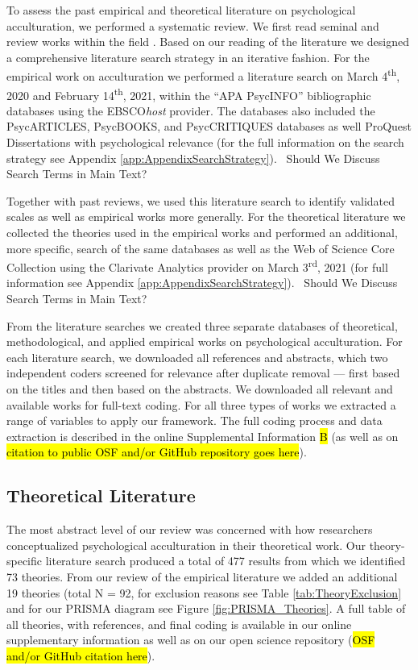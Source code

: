 To assess the past empirical and theoretical literature on psychological
acculturation, we performed a systematic review. We first read seminal
and review works within the field
\citep[including,][]{Ward2019, Berry1997b, Berry2003, Szapocznik1978, Sam2006a, Rudmin2003a}.
Based on our reading of the literature we designed a comprehensive
literature search strategy in an iterative fashion. For the empirical
work on acculturation we performed a literature search on March
4\textsuperscript{th}, 2020 and February 14\textsuperscript{th}, 2021,
within the ``APA PsycINFO'' bibliographic databases using the
EBSCO\textit{host} provider. The databases also included the
PsycARTICLES, PsycBOOKS, and PsycCRITIQUES databases as well ProQuest
Dissertations with psychological relevance (for the full information on
the search strategy see Appendix \ref{app:AppendixSearchStrategy}).
\Warning~Should We Discuss Search Terms in Main Text? \Warning

Together with past reviews, we used this literature search to identify
validated scales as well as empirical works more generally. For the
theoretical literature we collected the theories used in the empirical
works and performed an additional, more specific, search of the same
databases as well as the Web of Science Core Collection using the
Clarivate Analytics provider on March 3\textsuperscript{rd}, 2021 (for
full information see Appendix \ref{app:AppendixSearchStrategy}).
\Warning~Should We Discuss Search Terms in Main Text? \Warning~

From the literature searches we created three separate databases of
theoretical, methodological, and applied empirical works on
psychological acculturation. For each literature search, we downloaded
all references and abstracts, which two independent coders screened for
relevance after duplicate removal --- first based on the titles and then
based on the abstracts. We downloaded all relevant and available works
for full-text coding. For all three types of works we extracted a range
of variables to apply our framework. The full coding process and data
extraction is described in the online Supplemental Information \hl{B}
(as well as on
\hl{citation to public OSF and/or GitHub repository goes here}).

\subsection{Theoretical Literature}

The most abstract level of our review was concerned with how researchers
conceptualized psychological acculturation in their theoretical work.
Our theory-specific literature search produced a total of 477 results
from which we identified 73 theories. From our review of the empirical
literature we added an additional 19 theories (total N = 92, for
exclusion reasons see Table \ref{tab:TheoryExclusion} and for our PRISMA
diagram see Figure \ref{fig:PRISMA_Theories}. A full table of all
theories, with references, and final coding is available in our online
supplementary information as well as on our open science repository
(\hl{OSF and/or GitHub citation here}).

